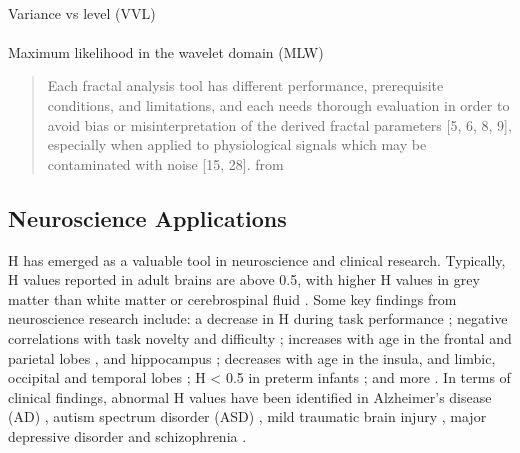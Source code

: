 \documentclass[
  sn-vancouver,
  Numbered,
  referee,
  lineno]{sn-jnl}
\makeatletter
\let\oldparagraph\paragraph
\renewcommand{\paragraph}{
    \@ifstar
      \xxxParagraphStar
      \xxxParagraphNoStar
  }
\newcommand{\xxxParagraphStar}[1]{\oldparagraph*{#1}\mbox{}}
\newcommand{\xxxParagraphNoStar}[1]{\oldparagraph{#1}\mbox{}}
\makeatother
\begin{document}
\paragraph{Variance vs level (VVL)}\label{variance-vs-level-vvl}

\paragraph{Maximum likelihood in the wavelet domain
(MLW)}\label{maximum-likelihood-in-the-wavelet-domain-mlw}

\begin{quote}
Each fractal analysis tool has different performance, prerequisite
conditions, and limitations, and each needs thorough evaluation in order
to avoid bias or misinterpretation of the derived fractal parameters
{[}5, 6, 8, 9{]}, especially when applied to physiological signals which
may be contaminated with noise {[}15, 28{]}. from
\citep{ekePhysiologicalTimeSeries2000}
\end{quote}

\subsection{Neuroscience Applications}\label{neuroscience-applications}

H has emerged as a valuable tool in neuroscience and clinical research.
Typically, H values reported in adult brains are above 0.5, with higher
H values in grey matter than white matter or cerebrospinal fluid
\citep{dongHurstExponentAnalysis2018, winkMonofractalMultifractalDynamics2008}.
Some key findings from neuroscience research include: a decrease in H
during task performance
\citep{ciuciuInterplayFunctionalConnectivity2014, heScaleFreePropertiesFunctional2011};
negative correlations with task novelty and difficulty
\citep{churchillSuppressionScalefreeFMRI2016}; increases with age in the
frontal and parietal lobes \citep{dongHurstExponentAnalysis2018}, and
hippocampus \citep{winkAgeCholinergicEffects2006}; decreases with age in
the insula, and limbic, occipital and temporal lobes
\citep{dongHurstExponentAnalysis2018}; H \textless{} 0.5 in preterm
infants \citep{mellaTemporalComplexityBOLDsignal2024}; and more
\citep{campbellMonofractalAnalysisFunctional2022}. In terms of clinical
findings, abnormal H values have been identified in Alzheimer's disease
(AD)
\citep{maximFractionalGaussianNoise2005, warsiCorrelatingBrainBlood2012},
autism spectrum disorder (ASD)
\citep{donaTemporalFractalAnalysis2017, laiShiftRandomnessBrain2010, linkeAlteredDevelopmentHurst2024, uscatescuUsingExcitationInhibition2022},
mild traumatic brain injury \citep{donaFractalAnalysisBrain2017}, major
depressive disorder
\citep{weiIdentifyingMajorDepressive2013, jingIdentifyingCurrentRemitted2017}
and schizophrenia
\citep{sokunbiNonlinearComplexityAnalysis2014, uscatescuUsingExcitationInhibition2022}.
\end{document}
